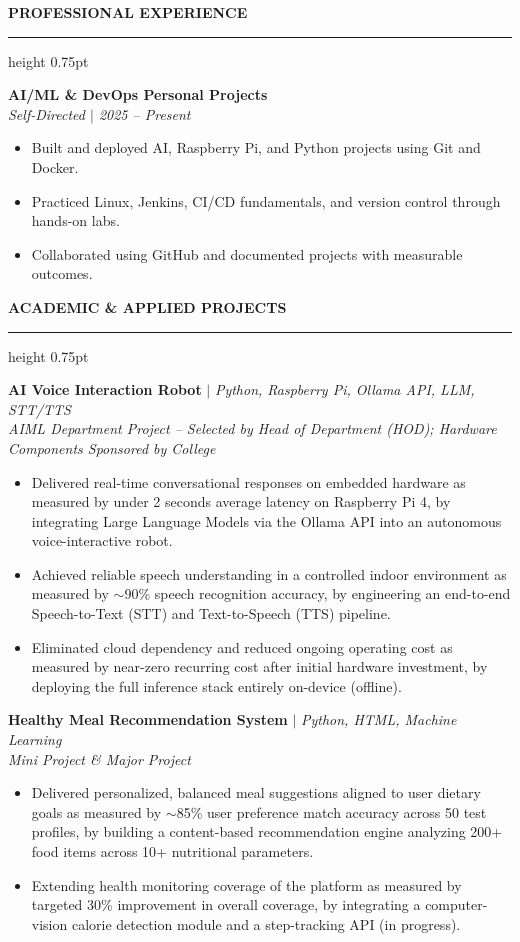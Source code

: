 \documentclass[10pt,a4paper]{article}
\newcommand{\resumesection}[1]{%
  \vspace{14pt}%
  {\large\textbf{\color{primary}#1}}\par\vspace{3pt}%
  {\color{primary}\hrule height 0.75pt}\vspace{7pt}%
}
\begin{document}
\resumesection{PROFESSIONAL EXPERIENCE}
\noindent\textbf{AI/ML \& DevOps Personal Projects}\\[3pt]
\textit{Self-Directed $|$ 2025 -- Present}
\begin{itemize}
    \item Built and deployed AI, Raspberry Pi, and Python projects using Git and Docker.
    \item Practiced Linux, Jenkins, CI/CD fundamentals, and version control through hands-on labs.
    \item Collaborated using GitHub and documented projects with measurable outcomes.
\end{itemize}

\resumesection{ACADEMIC \& APPLIED PROJECTS}
\noindent\textbf{AI Voice Interaction Robot} $|$ \textit{Python, Raspberry Pi, Ollama API, LLM, STT/TTS}\\[3pt]
\textit{AIML Department Project -- Selected by Head of Department (HOD); Hardware Components Sponsored by College}
\begin{itemize}
    \item Delivered real-time conversational responses on embedded hardware as measured by under 2 seconds average latency on Raspberry Pi 4, by integrating Large Language Models via the Ollama API into an autonomous voice-interactive robot.
    \item Achieved reliable speech understanding in a controlled indoor environment as measured by $\sim$90\% speech recognition accuracy, by engineering an end-to-end Speech-to-Text (STT) and Text-to-Speech (TTS) pipeline.
    \item Eliminated cloud dependency and reduced ongoing operating cost as measured by near-zero recurring cost after initial hardware investment, by deploying the full inference stack entirely on-device (offline).
\end{itemize}

\vspace{8pt}
\noindent\textbf{Healthy Meal Recommendation System} $|$ \textit{Python, HTML, Machine Learning}\\[3pt]
\textit{Mini Project \& Major Project}
\begin{itemize}
    \item Delivered personalized, balanced meal suggestions aligned to user dietary goals as measured by $\sim$85\% user preference match accuracy across 50 test profiles, by building a content-based recommendation engine analyzing 200+ food items across 10+ nutritional parameters.
    \item Extending health monitoring coverage of the platform as measured by targeted 30\% improvement in overall coverage, by integrating a computer-vision calorie detection module and a step-tracking API (in progress).
\end{itemize}
\end{document}
